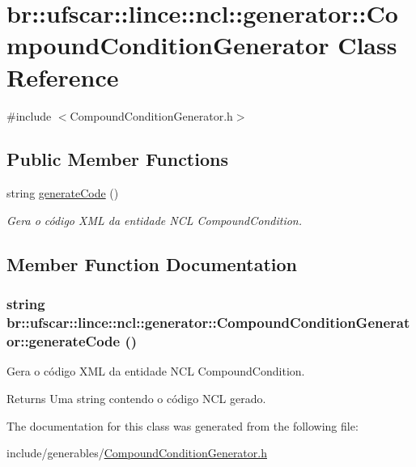 \hypertarget{classbr_1_1ufscar_1_1lince_1_1ncl_1_1generator_1_1CompoundConditionGenerator}{
\section{br::ufscar::lince::ncl::generator::CompoundConditionGenerator Class Reference}
\label{classbr_1_1ufscar_1_1lince_1_1ncl_1_1generator_1_1CompoundConditionGenerator}
}


{\ttfamily \#include $<$CompoundConditionGenerator.h$>$}

\subsection*{Public Member Functions}
\begin{DoxyCompactItemize}
\item 
string \hyperlink{classbr_1_1ufscar_1_1lince_1_1ncl_1_1generator_1_1CompoundConditionGenerator_a0a96c40615913202ffce04e1be9d9a51}{generateCode} ()
\begin{DoxyCompactList}\small\item\em Gera o código XML da entidade NCL CompoundCondition. \item\end{DoxyCompactList}\end{DoxyCompactItemize}


\subsection{Member Function Documentation}
\hypertarget{classbr_1_1ufscar_1_1lince_1_1ncl_1_1generator_1_1CompoundConditionGenerator_a0a96c40615913202ffce04e1be9d9a51}{
\subsubsection[{generateCode}]{\setlength{\rightskip}{0pt plus 5cm}string br::ufscar::lince::ncl::generator::CompoundConditionGenerator::generateCode ()}}
\label{classbr_1_1ufscar_1_1lince_1_1ncl_1_1generator_1_1CompoundConditionGenerator_a0a96c40615913202ffce04e1be9d9a51}


Gera o código XML da entidade NCL CompoundCondition. 

\begin{DoxyReturn}{Returns}
Uma string contendo o código NCL gerado. 
\end{DoxyReturn}


The documentation for this class was generated from the following file:\begin{DoxyCompactItemize}
\item 
include/generables/\hyperlink{CompoundConditionGenerator_8h}{CompoundConditionGenerator.h}\end{DoxyCompactItemize}
